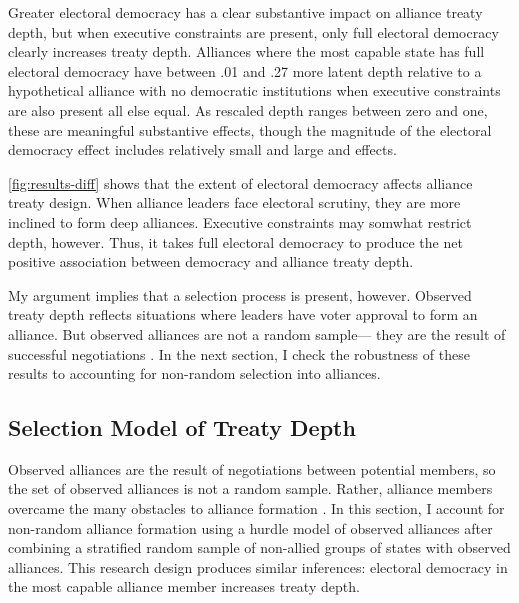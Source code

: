\documentclass[12pt]{article}
\begin{document}
Greater electoral democracy has a clear substantive impact on alliance treaty depth, but when executive constraints are present, only full electoral democracy clearly increases treaty depth. 
Alliances where the most capable state has full electoral democracy have between .01 and .27 more latent depth relative to a hypothetical alliance with no democratic institutions when executive constraints are also present all else equal.
As rescaled depth ranges between zero and one, these are meaningful substantive effects, though the magnitude of the electoral democracy effect includes relatively small and large and effects. 


\autoref{fig:results-diff} shows that the extent of electoral democracy affects alliance treaty design.
When alliance leaders face electoral scrutiny, they are more inclined to form deep alliances. 
Executive constraints may somwhat restrict depth, however.
Thus, it takes full electoral democracy to produce the net positive association between democracy and alliance treaty depth. 


My argument implies that a selection process is present, however. 
Observed treaty depth reflects situations where leaders have voter approval to form an alliance.
But observed alliances are not a random sample--- they are the result of successful negotiations \citep{Poast2019a}. 
In the next section, I check the robustness of these results to accounting for non-random selection into alliances. 


\subsection{Selection Model of Treaty Depth} 


Observed alliances are the result of negotiations between potential members, so the set of observed alliances is not a random sample.
Rather, alliance members overcame the many obstacles to alliance formation \citep{Poast2019a}.  
In this section, I account for non-random alliance formation using a hurdle model of observed alliances after combining a stratified random sample of non-allied groups of states with observed alliances. 
This research design produces similar inferences: electoral democracy in the most capable alliance member increases treaty depth. 
\end{document}
